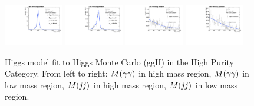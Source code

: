 \begin{figure}[h]
  \centering
\includegraphics[width=0.23\textwidth]{figures/sec-signals/HiggsShapes/ggh_HM_signal_fit_mgg_cat0.pdf}
\includegraphics[width=0.23\textwidth]{figures/sec-signals/HiggsShapes/ggh_LM_signal_fit_mgg_cat0.pdf}
\includegraphics[width=0.23\textwidth]{figures/sec-signals/HiggsShapes/ggh_HM_signal_fit_mjj_cat0.pdf}
\includegraphics[width=0.23\textwidth]{figures/sec-signals/HiggsShapes/ggh_LM_signal_fit_mjj_cat0.pdf}
  \caption{Higgs model fit to Higgs Monte Carlo (ggH) in the High Purity Category. From left to right: $M(\gamma\gamma)$ in high mass region, $M(\gamma\gamma)$ in low mass region, $M(jj)$ in high mass region, $M(jj)$ in low mass region.}
  \label{fig:higgs_fit_ggh}
\end{figure}

